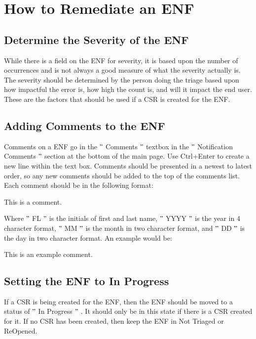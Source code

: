 \documentclass[a4paper,12pt]{report}
\begin{document}
\section*{How to Remediate an ENF}
 \par
\subsection*{Determine the Severity of the ENF}
 \par
While there is a field on the ENF for severity, it is based upon the number of occurrences and is not always a good measure of what the severity actually is. The severity should be determined by the person doing the triage based upon how impactful the error is, how high the count is, and will it impact the end user. These are the factors that should be used if a CSR is created for the ENF. \par
\subsection*{Adding Comments to the ENF}
 \par
Comments on a ENF go in the  $ " $ Comments $ " $  textbox in the  $ " $ Notification Comments $ " $  section at the bottom of the main page. Use Ctrl+Enter to create a new line within the text box. Comments should be presented in a newest to latest order, so any new comments should be added to the top of the comments list. Each comment should be in the following format: \par
{\fontsize{9pt}{9pt}\selectfont [FL YYYY-MM-DD] This is a comment.} \par
Where  $ " $ FL $ " $  is the initials of first and last name,  $ " $ YYYY $ " $  is the year in 4 character format,  $ " $ MM $ " $  is the month in two character format, and  $ " $ DD $ " $  is the day in two character format. An example would be: \par
{\fontsize{9pt}{9pt}\selectfont [KT 2016-08-01] This is an example comment.} \par
\subsection*{Setting the ENF to In Progress}
 \par
If a CSR is being created for the ENF, then the ENF should be moved to a status of  $ " $ In Progress $ " $ . It should only be in this state if there is a CSR created for it. If no CSR has been created, then keep the ENF in Not Triaged or ReOpened. \par
\end{document}
